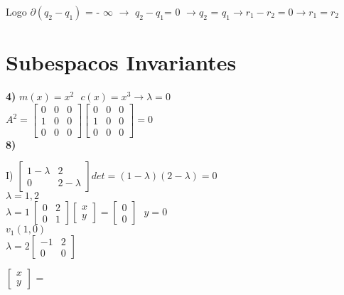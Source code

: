 \documentclass[a4paper,12pt]{report}
\begin{document}
Logo $\partial (q_2 - q_1)$ = - $\infty$ $\rightarrow$ 
$q_2 - q_1 $= 0 $\rightarrow q_2$ = $q_1 \rightarrow r_1 - r_2 = 0 \rightarrow r_1=r_2$




\section{Subespacos Invariantes}
\textbf{4)}
$m(x) = x^2 \ \ \ c(x) = x^3 \rightarrow \lambda = 0$\\


$A^2 =  \left [\begin{array}{rrr}
0&0&0\\
1&0&0\\
0&0&0
\end{array}\right] \left [\begin{array}{rrr}
0&0&0\\
1&0&0\\
0&0&0
\end{array}\right] = 0$ \\


\textbf{8)}

I) $\left [\begin{array}{rrr}
1- \lambda &2\\
0&2- \lambda
\end{array}\right] 
det = (1 - \lambda)( 2 - \lambda) = 0 $\\

$\lambda = 1 ,2$\\

$\lambda = 1 \ \left [\begin{array}{rrr}
0&2\\
0&1
\end{array}\right]  \left [\begin{array}{rrr}
x\\
y
\end{array}\right]  = \left [\begin{array}{rrr}
0\\
0
\end{array}\right] \ \ \   y = 0$ \\

$v_1(1,0)$ \\

$\lambda = 2 \left [\begin{array}{rrr}
-1&2\\
0&0
\end{array}\right] $

$ \left [\begin{array}{rrr}
x\\
y
\end{array}\right]$  = 
\end{document}
